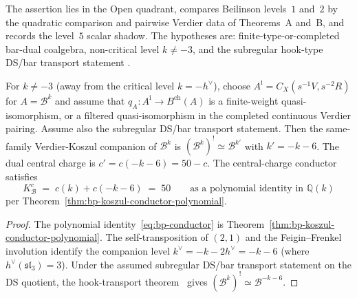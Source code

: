 \begin{proposition}
\label{prop:bp-self-duality}
The assertion lies in the Open quadrant, compares Beilinson
levels~$1$ and~$2$ by the quadratic comparison and pairwise Verdier
data of Theorems~A and~B,
and records the level~$5$ scalar shadow. The hypotheses are:
finite-type-or-completed bar-dual coalgebra, non-critical level
$k\neq-3$, and the subregular hook-type DS/bar transport statement
\cite{CLNS24,FehilyHook}.

For $k \neq -3$ \textup{(}away from the critical level $k = -h^\vee$\textup{)},
choose $A^{\mathrm i}=C_X(s^{-1}V,s^{-2}R)$ for
$A=\mathcal B^k$ and assume that
$q_A\colon A^{\mathrm i}\to B^{\mathrm{ch}}(A)$ is a finite-weight
quasi-isomorphism, or a filtered quasi-isomorphism in the completed
continuous Verdier pairing. Assume also the subregular DS/bar
transport statement.
Then the same-family Verdier-Koszul companion of $\mathcal{B}^k$ is
$(\mathcal{B}^k)^! \simeq \mathcal{B}^{k'}$ with
$k' = -k - 6$. The dual central charge is $c' = c(-k-6) = 50 - c$.
The central-charge conductor satisfies
\begin{equation}\label{eq:bp-conductor}
K^c_{\mathcal{B}} \;=\; c(k) + c(-k-6) \;=\; 50
\qquad \text{as a polynomial identity in } \mathbb{Q}(k)
\end{equation}
per Theorem~\ref{thm:bp-koszul-conductor-polynomial}.
\end{proposition}

\begin{proof}
The polynomial identity~\eqref{eq:bp-conductor} is
Theorem~\ref{thm:bp-koszul-conductor-polynomial}. The
self-transposition of $(2,1)$ and the Feigin--Frenkel involution
identify the companion level
$k^\vee = -k - 2h^\vee = -k-6$
\textup{(}where $h^\vee(\mathfrak{sl}_3) = 3$\textup{)}.
Under the assumed subregular DS/bar transport statement on the DS
quotient, the hook-transport theorem~\cite{CLNS24,FehilyHook} gives
$(\mathcal{B}^k)^! \simeq \mathcal{B}^{-k-6}$.
\end{proof}

